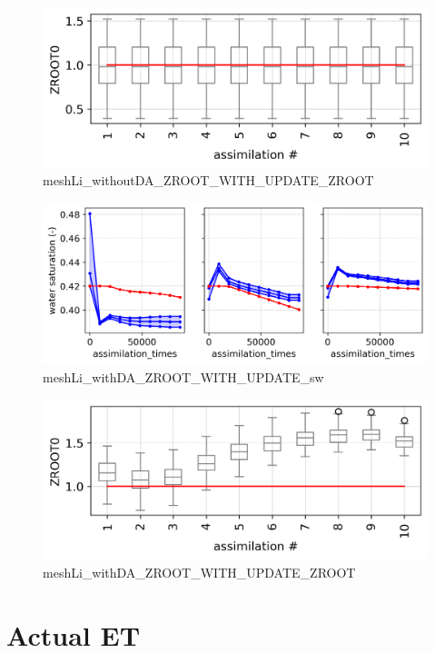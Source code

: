 \documentclass{article}
\begin{document}
\begin{figure}[!htbp]
\centering
\includegraphics[width=0.75\linewidth]{files/meshLi_withoutDA_ZRO-ba31c6c59b620a6e618131fdaa21284b.png}
\caption[]{meshLi\_withoutDA\_ZROOT\_WITH\_UPDATE\_ZROOT}
\label{meshLi_withoutDA_ZROOT_WITH_UPDATE_ZROOT}
\end{figure}

\begin{figure}[!htbp]
\centering
\includegraphics[width=0.75\linewidth]{files/meshLi_withDA_ZROOT_-9dcd843c7ecc77571709f13912526f64.png}
\caption[]{meshLi\_withDA\_ZROOT\_WITH\_UPDATE\_sw}
\label{meshLi_withDA_ZROOT_WITH_UPDATE_sw}
\end{figure}

\begin{figure}[!htbp]
\centering
\includegraphics[width=0.75\linewidth]{files/meshLi_withDA_ZROOT_-841c61080a979f5d7317d36b67fbe998.png}
\caption[]{meshLi\_withDA\_ZROOT\_WITH\_UPDATE\_ZROOT}
\label{SMC_withoutDA_icsw}
\end{figure}

\section{Actual ET}
\end{document}
